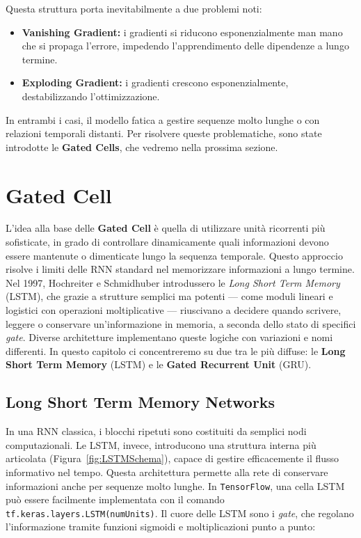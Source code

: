 Questa struttura porta inevitabilmente a due problemi noti:
\begin{itemize}
    \item \textbf{Vanishing Gradient:} i gradienti si riducono esponenzialmente man mano che si propaga l’errore, impedendo l’apprendimento delle dipendenze a lungo termine.
    \item \textbf{Exploding Gradient:} i gradienti crescono esponenzialmente, destabilizzando l’ottimizzazione.
\end{itemize}

In entrambi i casi, il modello fatica a gestire sequenze molto lunghe o con relazioni temporali distanti. Per risolvere queste problematiche, sono state introdotte le \textbf{Gated Cells}, che vedremo nella prossima sezione.

\section{Gated Cell}
L'idea alla base delle \textbf{Gated Cell} è quella di utilizzare unità ricorrenti più sofisticate, in grado di controllare dinamicamente quali informazioni devono essere mantenute o dimenticate lungo la sequenza temporale. Questo approccio risolve i limiti delle RNN standard nel memorizzare informazioni a lungo termine. Nel 1997, Hochreiter e Schmidhuber introdussero le \textit{Long Short Term Memory} (LSTM), che grazie a strutture semplici ma potenti — come moduli lineari e logistici con operazioni moltiplicative — riuscivano a decidere quando scrivere, leggere o conservare un'informazione in memoria, a seconda dello stato di specifici \textit{gate}. Diverse architetture implementano queste logiche con variazioni e nomi differenti. In questo capitolo ci concentreremo su due tra le più diffuse: le \textbf{Long Short Term Memory} (LSTM) e le \textbf{Gated Recurrent Unit} (GRU).

\begin{figure}[!ht]
    \centering
\end{figure}

\subsection{Long Short Term Memory Networks}
In una RNN classica, i blocchi ripetuti sono costituiti da semplici nodi computazionali. Le LSTM, invece, introducono una struttura interna più articolata (Figura~\ref{fig:LSTMSchema}), capace di gestire efficacemente il flusso informativo nel tempo. Questa architettura permette alla rete di conservare informazioni anche per sequenze molto lunghe. In \texttt{TensorFlow}, una cella LSTM può essere facilmente implementata con il comando \texttt{tf.keras.layers.LSTM(numUnits)}. Il cuore delle LSTM sono i \textit{gate}, che regolano l'informazione tramite funzioni sigmoidi e moltiplicazioni punto a punto:

